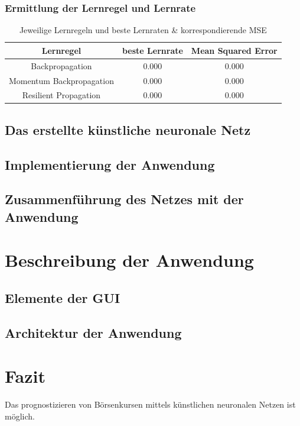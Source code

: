 \documentclass[a4paper,DIV11,bibliography=totoc,headings=normal,ngerman,headsepline,listof=totoc,parskip=half]{scrreprt}
\begin{document}
\subsection{Ermittlung der Lernregel und Lernrate} %

\begin{table}[H]
  \centering
  \begin{tabular}{|c|c|c|}
  \hline 
  \rule[0ex]{0pt}{2.5ex} Lernregel & beste Lernrate & Mean Squared Error \\ 
  \hline 
  \rule[0ex]{0pt}{2.5ex} Backpropagation & 0.000 & 0.000 \\ 
  \hline 
  \rule[0ex]{0pt}{2.5ex} Momentum Backpropagation & 0.000 & 0.000\\ 
  \hline 
  \rule[0ex]{0pt}{2.5ex} Resilient Propagation & 0.000 & 0.000 \\ 
  \hline 
  \end{tabular} 
  \caption{Jeweilige Lernregeln und beste Lernraten \& korrespondierende MSE}
  \label{tab:tab3}
\end{table}
\section{Das erstellte künstliche neuronale Netz}
\section{Implementierung der Anwendung} %
\section{Zusammenführung des Netzes mit der Anwendung}


\chapter{Beschreibung der Anwendung} %
\section{Elemente der GUI} %
\section{Architektur der Anwendung} %

\chapter{Fazit} %
\label{cha:Fazit}
Das prognostizieren von Börsenkursen mittels künstlichen neuronalen Netzen ist möglich.


\end{document}

